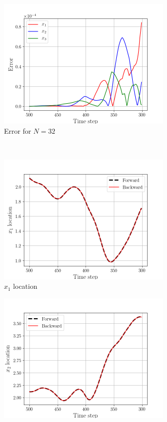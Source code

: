 \begin{figure}[H]
    \begin{subfigure}[H]{0.45\textwidth}
        \includegraphics[height=2.5in]{media/rk4/run-32/error-32-2.png}
        \caption{Error for $N=32$}
    \end{subfigure}
    ~
    \begin{subfigure}[H]{0.45\textwidth}
        \includegraphics[height=2.5in]{media/rk4/run-32/x1-32-tracking-2.png}
        \caption{$x_{1}$ location}
    \end{subfigure}
    \newline
    \begin{subfigure}[H]{0.45\textwidth}
        \includegraphics[height=2.5in]{media/rk4/run-32/x2-32-tracking-2.png}

\end{subfigure}
\end{figure}
